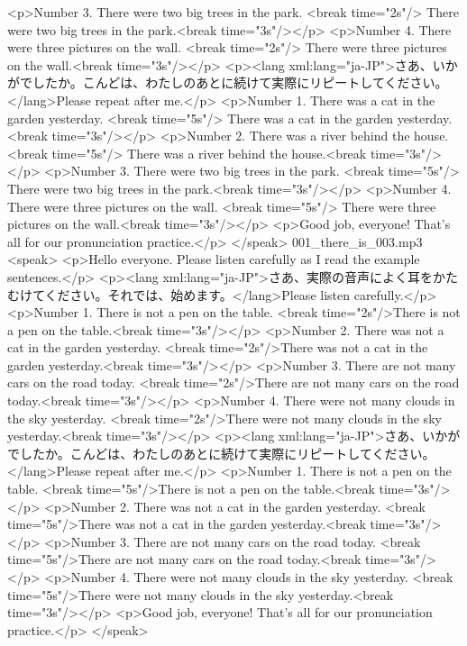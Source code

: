 <p>Number 3.  There were two big trees in the park. <break time="2s"/> There were two big trees in the park.<break time="3s"/></p>
<p>Number 4.  There were three pictures on the wall. <break time="2s"/> There were three pictures on the wall.<break time="3s"/></p>
<p><lang xml:lang="ja-JP">さあ、いかがでしたか。こんどは、わたしのあとに続けて実際にリピートしてください。</lang>Please repeat after me.</p>
<p>Number 1.   There was a cat in the garden yesterday. <break time="5s"/> There was a cat in the garden yesterday.<break time="3s"/></p>
<p>Number 2.   There was a river behind the house. <break time="5s"/> There was a river behind the house.<break time="3s"/></p>
<p>Number 3.   There were two big trees in the park. <break time="5s"/> There were two big trees in the park.<break time="3s"/></p>
<p>Number 4.   There were three pictures on the wall. <break time="5s"/> There were three pictures on the wall.<break time="3s"/></p>
<p>Good job, everyone! That's all for our pronunciation practice.</p>
</speak>
001_there_is_003.mp3
<speak>
<p>Hello everyone. Please listen carefully as I read the example sentences.</p>
<p><lang xml:lang="ja-JP">さあ、実際の音声によく耳をかたむけてください。それでは、始めます。</lang>Please listen carefully.</p>
<p>Number 1. There is not a pen on the table. <break time="2s"/>There is not a pen on the table.<break time="3s"/></p>
<p>Number 2. There was not a cat in the garden yesterday. <break time="2s"/>There was not a cat in the garden yesterday.<break time="3s"/></p>
<p>Number 3. There are not many cars on the road today. <break time="2s"/>There are not many cars on the road today.<break time="3s"/></p>
<p>Number 4. There were not many clouds in the sky yesterday. <break time="2s"/>There were not many clouds in the sky yesterday.<break time="3s"/></p>
<p><lang xml:lang="ja-JP">さあ、いかがでしたか。こんどは、わたしのあとに続けて実際にリピートしてください。</lang>Please repeat after me.</p>
<p>Number 1.  There is not a pen on the table. <break time="5s"/>There is not a pen on the table.<break time="3s"/></p>
<p>Number 2.  There was not a cat in the garden yesterday. <break time="5s"/>There was not a cat in the garden yesterday.<break time="3s"/></p>
<p>Number 3.  There are not many cars on the road today. <break time="5s"/>There are not many cars on the road today.<break time="3s"/></p>
<p>Number 4.  There were not many clouds in the sky yesterday. <break time="5s"/>There were not many clouds in the sky yesterday.<break time="3s"/></p>
<p>Good job, everyone! That's all for our pronunciation practice.</p>
</speak>
